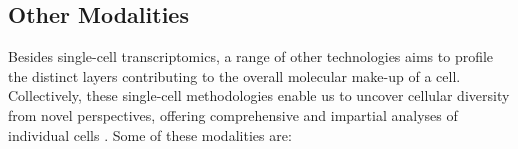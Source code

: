 \subsection{Other Modalities}
\label{sec:scrna_modalities}

Besides single-cell transcriptomics, a range of other technologies aims to profile the distinct layers contributing to the overall molecular make-up of a cell. Collectively, these single-cell methodologies enable us to uncover cellular diversity from novel perspectives, offering comprehensive and impartial analyses of individual cells \textbf{\cite{stein_single-cell_2021}}. Some of these modalities are:\\



